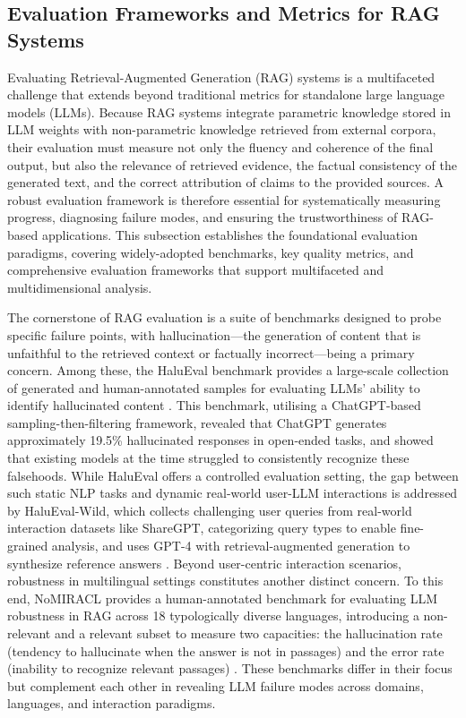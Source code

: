 \documentclass[11pt]{article}
\begin{document}
\subsection{Evaluation Frameworks and Metrics for RAG Systems}

Evaluating Retrieval-Augmented Generation (RAG) systems is a multifaceted challenge that extends beyond traditional metrics for standalone large language models (LLMs). Because RAG systems integrate parametric knowledge stored in LLM weights with non-parametric knowledge retrieved from external corpora, their evaluation must measure not only the fluency and coherence of the final output, but also the relevance of retrieved evidence, the factual consistency of the generated text, and the correct attribution of claims to the provided sources. A robust evaluation framework is therefore essential for systematically measuring progress, diagnosing failure modes, and ensuring the trustworthiness of RAG-based applications. This subsection establishes the foundational evaluation paradigms, covering widely-adopted benchmarks, key quality metrics, and comprehensive evaluation frameworks that support multifaceted and multidimensional analysis.

The cornerstone of RAG evaluation is a suite of benchmarks designed to probe specific failure points, with hallucination---the generation of content that is unfaithful to the retrieved context or factually incorrect---being a primary concern. Among these, the HaluEval benchmark provides a large-scale collection of generated and human-annotated samples for evaluating LLMs' ability to identify hallucinated content \cite{ref123}. This benchmark, utilising a ChatGPT-based sampling-then-filtering framework, revealed that ChatGPT generates approximately 19.5\% hallucinated responses in open-ended tasks, and showed that existing models at the time struggled to consistently recognize these falsehoods. While HaluEval offers a controlled evaluation setting, the gap between such static NLP tasks and dynamic real-world user-LLM interactions is addressed by HaluEval-Wild, which collects challenging user queries from real-world interaction datasets like ShareGPT, categorizing query types to enable fine-grained analysis, and uses GPT-4 with retrieval-augmented generation to synthesize reference answers \cite{ref124}. Beyond user-centric interaction scenarios, robustness in multilingual settings constitutes another distinct concern. To this end, NoMIRACL provides a human-annotated benchmark for evaluating LLM robustness in RAG across 18 typologically diverse languages, introducing a non-relevant and a relevant subset to measure two capacities: the hallucination rate (tendency to hallucinate when the answer is not in passages) and the error rate (inability to recognize relevant passages) \cite{ref125}. These benchmarks differ in their focus but complement each other in revealing LLM failure modes across domains, languages, and interaction paradigms.
\end{document}
